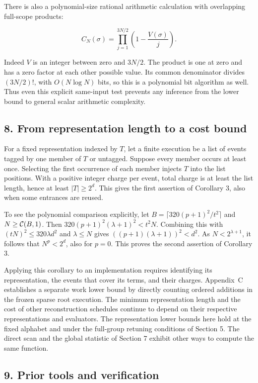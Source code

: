 \documentclass[
  11pt,
]{article}
\newcommand{\ceil}[1]{\lceil #1\rceil}
\begin{document}
There is also a polynomial-size rational arithmetic calculation with
overlapping full-scope products:

\[
C_N(\sigma)=\prod_{j=1}^{3N/2}\left(1-\frac{V(\sigma)}j\right).
\tag{I}
\]

Indeed \(V\) is an integer between zero and \(3N/2\). The product is one
at zero and has a zero factor at each other possible value. Its common
denominator divides \((3N/2)!\), with \(O(N\log N)\) bits, so this is a
polynomial bit algorithm as well. Thus even this explicit same-input
test prevents any inference from the lower bound to general scalar
arithmetic complexity.

\subsection{8. From representation length to a cost bound}
For a fixed representation indexed by \(T\), let a finite execution be
a list of events tagged by one member of \(T\) or untagged. Suppose every
member occurs at least once. Selecting the first occurrence of each
member injects \(T\) into the list positions. With a positive integer
charge per event, total charge is at least the list length, hence at
least \(|T|\ge2^d\). This gives the first assertion of Corollary 3,
also when some entrances are reused.

To see the polynomial comparison explicitly, let
\(B=\ceil{320(p+1)^2/t^2}\) and \(N\ge{\cal C}(B,1)\). Then
\(320(p+1)^2(\lambda+1)^2<t^2 N\). Combining this with
\((tN)^2\le320\lambda d^2\) and \(\lambda\le N\) gives
\(((p+1)(\lambda+1))^2<d^2\). As \(N<2^{\lambda+1}\), it follows
that \(N^p<2^d\), also for \(p=0\). This proves the second assertion
of Corollary 3.

Applying this corollary to an implementation requires identifying its
representation, the events that cover its terms, and their charges.
Appendix~C establishes a separate work lower bound by directly counting
ordered additions in the frozen sparse root execution. The minimum
representation length and the cost of other reconstruction schedules
continue to depend on their respective representations and evaluators.
The representation lower bounds here hold at the fixed alphabet and
under the full-group retuning conditions of Section 5. The direct scan
and the global statistic of Section 7 exhibit other ways to compute
the same function.

\subsection{9. Prior tools and
verification}\label{prior-tools-and-verification}
\end{document}
